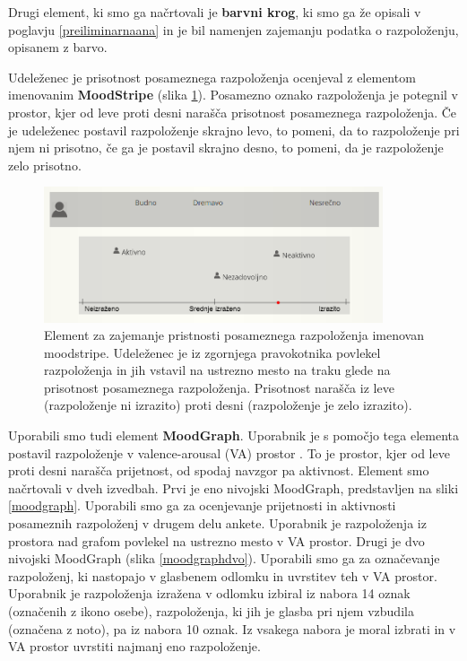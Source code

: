 \documentclass[a4paper, 12pt]{book}
\begin{document}
{Drugi element, ki smo ga načrtovali je \textbf{barvni krog}, ki smo ga že opisali v poglavju \ref{preiliminarnaana} in je bil namenjen zajemanju podatka o razpoloženju, opisanem z barvo. 

Udeleženec je prisotnost posameznega razpoloženja ocenjeval z elementom imenovanim \textbf{MoodStripe} (slika \ref{moodstripe}). Posamezno oznako razpoloženja je potegnil v prostor, kjer od leve proti desni narašča prisotnost posameznega razpoloženja. Če je udeleženec postavil razpoloženje skrajno levo, to pomeni, da to razpoloženje pri njem ni prisotno, če ga je postavil skrajno desno, to pomeni, da je razpoloženje zelo prisotno.

\begin{figure}[ht]
\centering
\includegraphics[width=10cm]{images/moodstripe.png}

\caption{Element za zajemanje pristnosti posameznega razpoloženja imenovan moodstripe. Udeleženec je iz zgornjega pravokotnika povlekel razpoloženja in jih vstavil na ustrezno mesto na traku glede na prisotnost posameznega razpoloženja. Prisotnost narašča iz leve (razpoloženje ni izrazito) proti desni (razpoloženje je zelo izrazito). }
\label{moodstripe}
\end{figure}



Uporabili smo tudi element \textbf{MoodGraph}. Uporabnik je s pomočjo tega elementa postavil razpoloženje v valence-arousal (VA) prostor \cite{Colibazzi2010}. To je prostor, kjer od leve proti desni narašča prijetnost, od spodaj navzgor pa aktivnost.   Element smo načrtovali v dveh izvedbah. Prvi je eno nivojski MoodGraph, predstavljen na sliki \ref{moodgraph}. Uporabili smo ga za ocenjevanje prijetnosti in aktivnosti posameznih razpoloženj v drugem delu ankete. Uporabnik je razpoloženja iz prostora nad grafom povlekel na ustrezno mesto v VA prostor. Drugi je dvo nivojski MoodGraph (slika \ref{moodgraphdvo}). Uporabili smo ga za označevanje razpoloženj, ki nastopajo v glasbenem odlomku in uvrstitev teh v VA prostor. Uporabnik je razpoloženja izražena v odlomku izbiral iz nabora 14 oznak (označenih z ikono osebe), razpoloženja, ki jih je glasba pri njem vzbudila (označena z noto), pa iz nabora 10 oznak. Iz vsakega nabora je moral izbrati in v VA prostor uvrstiti najmanj eno razpoloženje. 

}
\end{document}
